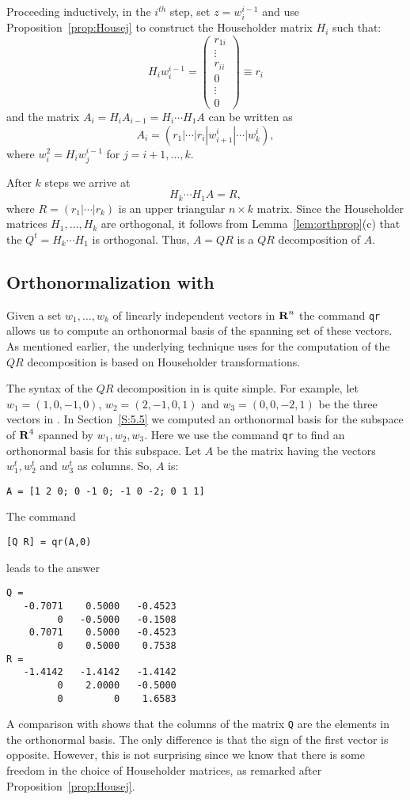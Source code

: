 Proceeding inductively, in the $i^{th}$ step, set $z=w_i^{i-1}$ and use
Proposition~\ref{prop:Housej} to construct the Householder matrix $H_i$ such
that:
\[
H_i w_i^{i-1} = \left(\begin{array}{c} r_{1i}\\ \vdots\\r_{ii}\\ 0 \\
\vdots\\ 0 \end{array}\right) \equiv r_i
\]
and the matrix $A_i=H_iA_{i-1}=H_i\cdots H_1 A$ can be written as
\[
A_i=(r_1|\cdots|r_i|w_{i+1}^i|\cdots|w_k^i),
\]
where $w_i^2=H_iw_j^{i-1}$ for $j=i+1,\ldots,k$.

After $k$ steps we arrive at
\[
H_k\cdots H_1 A = R,
\]
where $R=(r_1|\cdots|r_k)$ is an upper triangular $n\times k$ matrix.
Since the Householder matrices $H_1,\ldots,H_k$ are orthogonal, it follows
from Lemma~\ref{lem:orthprop}(c) that the $Q^t = H_k\cdots H_1$ is
orthogonal.  Thus, $A = QR$ is a $QR$ decomposition of $A$.

\subsection*{Orthonormalization with \Matlab}

Given a set $w_1,\ldots,w_k$ of linearly independent vectors in $\mbox{$\bf{R}$}^n$
the \Matlab command {\tt qr} allows us to compute an
orthonormal basis
of the spanning set
of these vectors.  As mentioned earlier, the underlying
technique \Matlab uses for the computation of the $QR$ decomposition is based
on
Householder transformations.

The syntax of the $QR$ decomposition in \Matlab is quite simple.  For example,
let $w_1=(1,0,-1,0)$, $w_2=(2,-1,0,1)$ and $w_3=(0,0,-2,1)$ be the three
vectors in .  In Section~\ref{S:5.5} we computed an orthonormal
basis for the subspace of $\mbox{$\bf{R}$}^4$ spanned by $w_1,w_2,w_3$.  Here we use the
\Matlab command {\tt qr} to find an orthonormal basis for this subspace.
Let $A$ be the matrix having the vectors $w_1^t,w_2^t$ and $w_3^t$
as columns.  So, $A$ is:
\begin{verbatim}
A = [1 2 0; 0 -1 0; -1 0 -2; 0 1 1]
\end{verbatim}
The command 
\begin{verbatim}
[Q R] = qr(A,0)
\end{verbatim}
leads to the answer
\begin{verbatim}
Q =
   -0.7071    0.5000   -0.4523
         0   -0.5000   -0.1508
    0.7071    0.5000   -0.4523
         0    0.5000    0.7538
R =
   -1.4142   -1.4142   -1.4142
         0    2.0000   -0.5000
         0         0    1.6583
\end{verbatim}
A comparison with  shows that the columns of the matrix
{\tt Q} are the elements in the orthonormal basis.  The only difference
is that the sign of the first vector is opposite.  However, this is
not surprising since we know that there is some freedom in the choice of
Householder matrices, as remarked after Proposition~\ref{prop:Housej}.

